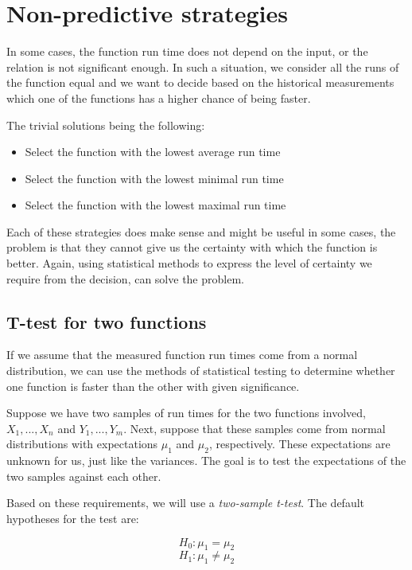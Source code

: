 \section{Non-predictive strategies}
\label{sec:non_predictive_strategies}

In some cases, the function run time does not depend on the input, or the relation is not significant enough. In such a situation, we consider all the runs of the function equal and we want to decide based on the historical measurements which one of the functions has a higher chance of being faster.

The trivial solutions being the following:
\begin{itemize}
	\item Select the function with the lowest average run time
	\item Select the function with the lowest minimal run time
	\item Select the function with the lowest maximal run time
\end{itemize}

Each of these strategies does make sense and might be useful in some cases, the problem is that they cannot give us the certainty with which the function is better. Again, using statistical methods to express the level of certainty we require from the decision, can solve the problem.

\subsection{T-test for two functions}
\label{subsec:t_test_two}

If we assume that the measured function run times come from a normal distribution, we can use the methods of statistical testing to determine whether one function is faster than the other with given significance. 

Suppose we have two samples of run times for the two functions involved, $X_1, ..., X_n$ and $Y_1, ..., Y_m$. Next, suppose that these samples come from normal distributions with expectations $\mu_1$ and $\mu_2$, respectively. These expectations are unknown for us, just like the variances. The goal is to test the expectations of the two samples against each other. 

Based on these requirements, we will use a \textit{two-sample t-test}. The default hypotheses for the test are:

\[
H_0: \mu_1 = \mu_2
\]
\[
H_1: \mu_1 \ne  \mu_2
\]

